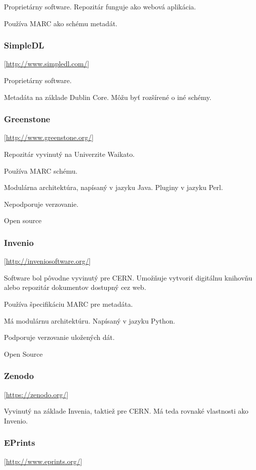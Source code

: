 \documentclass[thesis=M,slovak]{FITthesis}[2013/05/06]
\begin{document}
Proprietárny software. Repozitár funguje ako webová aplikácia.

Používa MARC ako schému metadát.

\subsubsection {SimpleDL}  [\url{http://www.simpledl.com/}]

Proprietárny software.

Metadáta na základe Dublin Core. Môžu byť rozšírené o iné schémy.

\subsubsection {Greenstone}  [\url{http://www.greenstone.org/}]

Repozitár vyvinutý na Univerzite Waikato.

Používa MARC schému.

Modulárna architektúra, napísaný v jazyku Java. Pluginy v jazyku Perl.

Nepodporuje verzovanie.

Open source

\subsubsection {Invenio}  [\url{http://inveniosoftware.org/}]

Software bol pôvodne vyvinutý pre CERN. Umožňuje vytvoriť digitálnu knihovňu alebo repozitár dokumentov dostupný cez web. 

Používa špecifikáciu MARC pre metadáta.

Má modulárnu architektúru. Napísaný v jazyku Python.

Podporuje verzovanie uložených dát.

Open Source

\subsubsection {Zenodo} [\url{https://zenodo.org/}]

Vyvinutý na základe Invenia, taktiež pre CERN. Má teda rovnaké vlastnosti ako Invenio.

\subsubsection {EPrints} [\url{http://www.eprints.org/}]
\end{document}
